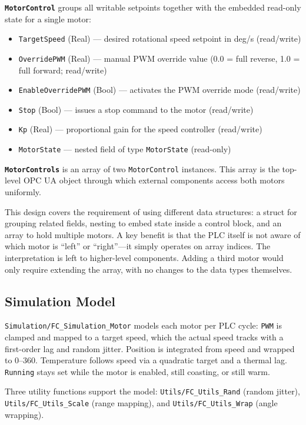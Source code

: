 \documentclass[a4paper,11pt]{article}
\newcommand{\tyMotorState}{\texttt{MotorState}}
\newcommand{\tyMotorControl}{\texttt{MotorControl}}
\newcommand{\tyMotorControls}{\texttt{MotorControls}}
\newcommand{\fcSimMotor}{\texttt{Simulation/FC\_Simulation\_Motor}}
\newcommand{\fcUtilsRand}{\texttt{Utils/FC\_Utils\_Rand}}
\newcommand{\fcUtilsScale}{\texttt{Utils/FC\_Utils\_Scale}}
\newcommand{\fcUtilsWrap}{\texttt{Utils/FC\_Utils\_Wrap}}
\newcommand{\fPWM}{\texttt{PWM}}
\newcommand{\fRunning}{\texttt{Running}}
\newcommand{\fTargetSpeed}{\texttt{TargetSpeed}}
\newcommand{\fOverridePWM}{\texttt{OverridePWM}}
\newcommand{\fEnableOverridePWM}{\texttt{EnableOverridePWM}}
\newcommand{\fStop}{\texttt{Stop}}
\newcommand{\fKp}{\texttt{Kp}}
\begin{document}
\textbf{\tyMotorControl} groups all writable setpoints together with the embedded read-only state for
a single motor:

\begin{itemize}
    \item \fTargetSpeed{} (Real) --- desired rotational speed setpoint in deg/s (read/write)
    \item \fOverridePWM{} (Real) --- manual PWM override value (0.0 = full reverse, 1.0 = full forward; read/write)
    \item \fEnableOverridePWM{} (Bool) --- activates the PWM override mode (read/write)
    \item \fStop{} (Bool) --- issues a stop command to the motor (read/write)
    \item \fKp{} (Real) --- proportional gain for the speed controller (read/write)
    \item \tyMotorState{} --- nested field of type \tyMotorState{} (read-only)
\end{itemize}

\textbf{\tyMotorControls} is an array of two \tyMotorControl{} instances. This array is the
top-level OPC UA object through which external components access both motors uniformly.

This design covers the requirement of using different data structures: a struct for grouping related
fields, nesting to embed state inside a control block, and an array to hold multiple motors. A key
benefit is that the PLC itself is not aware of which motor is ``left'' or ``right''---it simply
operates on array indices. The interpretation is left to higher-level components. Adding a third
motor would only require extending the array, with no changes to the data types themselves.

\subsection{Simulation Model}

\fcSimMotor{} models each motor per PLC cycle: \fPWM{} is clamped and mapped to a target speed,
which the actual speed tracks with a first-order lag and random jitter. Position is integrated from
speed and wrapped to 0--360\textdegree{}. Temperature follows speed via a quadratic target and a
thermal lag. \fRunning{} stays set while the motor is enabled, still coasting, or still warm.

Three utility functions support the model: \fcUtilsRand{} (random jitter),
\fcUtilsScale{} (range mapping), and \fcUtilsWrap{} (angle wrapping).
\end{document}
